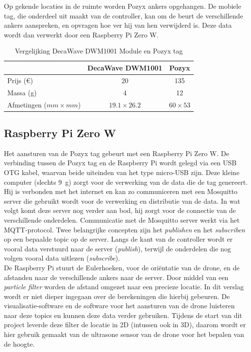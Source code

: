 Op gekende locaties in de ruimte worden Pozyx ankers opgehangen.
De mobiele tag, die onderdeel uit maakt van de controller, kan om de beurt de verschillende ankers aanspreken, en opvragen hoe ver hij van hen verwijderd is.
Deze data wordt dan verwerkt door een Raspberry Pi Zero W.\\

\begin{table}[p]
	\centering
	\begin{tabular}{ | l | c | c | } \hline
		& DecaWave DWM1001 & Pozyx \\
		\hline 
		\hline
		Prijs (\euro{}) & 20 & 135 \\ 
		\hline
		Massa (g) & 4 & 12 \\ 
		\hline
		Afmetingen ($mm \times mm$) & $19.1 \times 26.2$ & $60 \times 53$ \\ 
		\hline
	\end{tabular}
	\caption[Vergelijking DecaWave DWM1001 Module en Pozyx tag]{Vergelijking DecaWave DWM1001 Module en Pozyx tag}
	\label{tab:decavspozyx}
\end{table}

\subsection{Raspberry Pi Zero W} \label{sec:zerow}
Het aansturen van de Pozyx tag gebeurt met een Raspberry Pi Zero W.
De verbinding tussen de Pozyx tag en de Raspberry Pi wordt gelegd via een USB OTG kabel, waarvan beide uiteinden van het type micro-USB zijn.
Deze kleine computer (slechts \SI{9}{\g}) zorgt voor de verwerking van de data die de tag genereert.
Hij is verbonden met het internet en kan zo communiceren met een Mosquitto server die gebruikt wordt voor de verwerking en distributie van de data.
In wat volgt komt deze server nog verder aan bod, hij zorgt voor de connectie van de verschillende onderdelen.
Communicatie met de Mosquitto server werkt via het MQTT-protocol.
Twee belangrijke concepten zijn het \textit{publishen} en het \textit{subscriben} op een bepaalde topic op de server.
Langs de kant van de controller wordt er vooral data verstuurd naar de server (\textit{publish}), terwijl de onderdelen die nog volgen vooral data uitlezen (\textit{subscribe}).\\

De Raspberry Pi stuurt de Eulerhoeken, voor de ori\"entatie van de drone, en de afstanden naar de verschillende ankers naar de server. Door middel van een \textit{particle filter} worden de afstand omgezet naar een precieze locatie.
In dit verslag wordt er niet dieper ingegaan over de berekeningen die hierbij gebeuren.
De visualisatie-software en de software voor het aansturen van de drone luisteren naar deze topics en kunnen deze data verder gebruiken.
Tijdens de start van dit project leverde deze filter de locatie in 2D (intussen ook in 3D), daarom wordt er hier gebruik gemaakt van de ultrasone sensor van de drone voor het bepalen van de hoogte.\\


